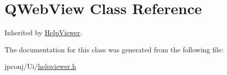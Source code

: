 \hypertarget{class_q_web_view}{}\section{Q\+Web\+View Class Reference}
\label{class_q_web_view}


Inherited by \hyperlink{class_help_viewer}{Help\+Viewer}.



The documentation for this class was generated from the following file\+:\begin{DoxyCompactItemize}
\item 
jpconj/\+Ui/\hyperlink{helpviewer_8h}{helpviewer.\+h}\end{DoxyCompactItemize}
